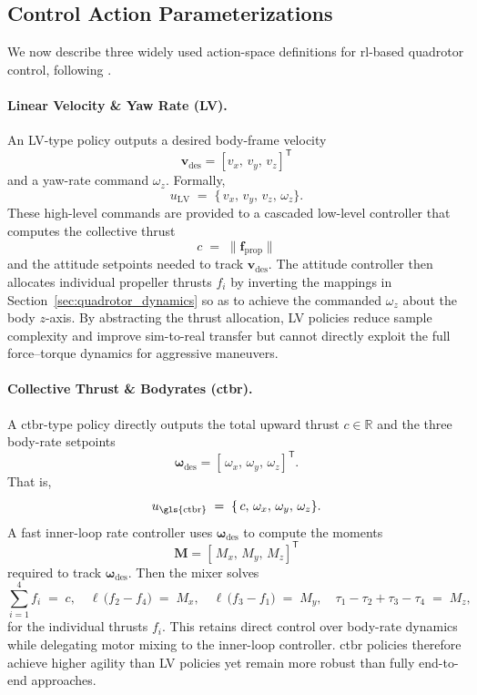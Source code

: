 \subsection{Control Action Parameterizations}
\label{sec:quadrotor_actions}

We now describe three widely used action-space definitions for \gls{rl}-based quadrotor control, following \cite{kaufmann_benchmark_2022}.

\paragraph{Linear Velocity \& Yaw Rate (LV).}  
An LV-type policy outputs a desired body-frame velocity 
\[
\mathbf{v}_{\mathrm{des}} = [v_{x},\,v_{y},\,v_{z}]^{\mathsf{T}}
\]
and a yaw-rate command \(\omega_{z}\). Formally,
\[
u_{\mathrm{LV}} \;=\; \{\,v_{x},\,v_{y},\,v_{z},\,\omega_{z}\}.
\]
These high-level commands are provided to a cascaded low-level controller that computes the collective thrust 
\[
c \;=\; \bigl\lVert \mathbf{f}_{\mathrm{prop}}\bigr\rVert
\]
and the attitude setpoints needed to track \(\mathbf{v}_{\mathrm{des}}\). The attitude controller then allocates individual propeller thrusts \(f_{i}\) by inverting the mappings in Section~\ref{sec:quadrotor_dynamics} so as to achieve the commanded \(\omega_{z}\) about the body \(z\)-axis. By abstracting the thrust allocation, LV policies reduce sample complexity and improve sim-to-real transfer but cannot directly exploit the full force–torque dynamics for aggressive maneuvers.

\paragraph{Collective Thrust \& Bodyrates (\gls{ctbr}).}  
A \gls{ctbr}-type policy directly outputs the total upward thrust \(c\in \mathbb{R}\) and the three body-rate setpoints 
\[
\boldsymbol{\omega}_{\mathrm{des}} = [\,\omega_{x},\,\omega_{y},\,\omega_{z}]^{\mathsf{T}}.
\]
That is,
\[
u_{\mathrm{\gls{ctbr}}} \;=\; \{\,c,\,\omega_{x},\,\omega_{y},\,\omega_{z}\}.
\]
A fast inner-loop rate controller uses \(\boldsymbol{\omega}_{\mathrm{des}}\) to compute the moments 
\[
\mathbf{M} = [\,M_{x},\,M_{y},\,M_{z}]^{\mathsf{T}}
\]
required to track \(\boldsymbol{\omega}_{\mathrm{des}}\). Then the mixer solves
\[
\sum_{i=1}^{4} f_{i} \;=\; c, 
\quad
\ell\,\bigl(f_{2} - f_{4}\bigr) \;=\; M_{x}, 
\quad
\ell\,\bigl(f_{3} - f_{1}\bigr) \;=\; M_{y}, 
\quad
\tau_{1} - \tau_{2} + \tau_{3} - \tau_{4} \;=\; M_{z},
\]
for the individual thrusts \(f_{i}\). This retains direct control over body-rate dynamics while delegating motor mixing to the inner-loop controller. \gls{ctbr} policies therefore achieve higher agility than LV policies yet remain more robust than fully end-to-end approaches.

